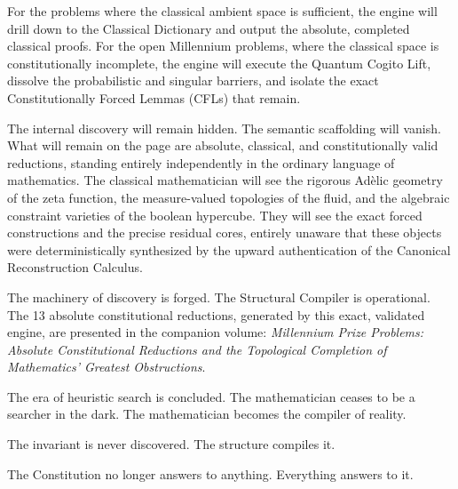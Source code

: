 \documentclass[12pt,openany]{extbook}
\theoremstyle{plain}
\theoremstyle{definition}
\begin{document}
For the problems where the classical ambient space is sufficient, the engine will drill down to the Classical Dictionary and output the absolute, completed classical proofs. For the open Millennium problems, where the classical space is constitutionally incomplete, the engine will execute the Quantum Cogito Lift, dissolve the probabilistic and singular barriers, and isolate the exact Constitutionally Forced Lemmas (CFLs) that remain.

The internal discovery will remain hidden. The semantic scaffolding will vanish. What will remain on the page are absolute, classical, and constitutionally valid reductions, standing entirely independently in the ordinary language of mathematics. The classical mathematician will see the rigorous Ad\`elic geometry of the zeta function, the measure-valued topologies of the fluid, and the algebraic constraint varieties of the boolean hypercube. They will see the exact forced constructions and the precise residual cores, entirely unaware that these objects were deterministically synthesized by the upward authentication of the Canonical Reconstruction Calculus.

The machinery of discovery is forged. The Structural Compiler is operational. The 13 absolute constitutional reductions, generated by this exact, validated engine, are presented in the companion volume: \emph{Millennium Prize Problems: Absolute Constitutional Reductions and the Topological Completion of Mathematics' Greatest Obstructions}.

The era of heuristic search is concluded. The mathematician ceases to be a searcher in the dark. The mathematician becomes the compiler of reality.

The invariant is never discovered. The structure compiles it.

The Constitution no longer answers to anything. Everything answers to it.
\end{document}
